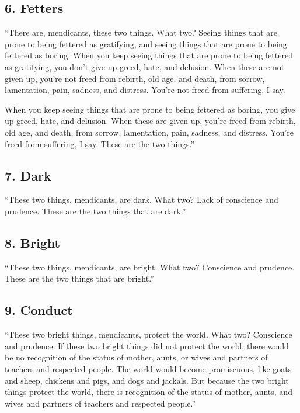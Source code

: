 \documentclass[12pt,openany]{book}%
\begin{document}
\subsection*{6. Fetters }

“There are, mendicants, these two things. What two? Seeing things that are prone to being fettered as gratifying, and seeing things that are prone to being fettered as boring. When you keep seeing things that are prone to being fettered as gratifying, you don’t give up greed, hate, and delusion. When these are not given up, you’re not freed from rebirth, old age, and death, from sorrow, lamentation, pain, sadness, and distress. You’re not freed from suffering, I say. 

When you keep seeing things that are prone to being fettered as boring, you give up greed, hate, and delusion. When these are given up, you’re freed from rebirth, old age, and death, from sorrow, lamentation, pain, sadness, and distress. You’re freed from suffering, I say. These are the two things.” 

\subsection*{7. Dark }

“These two things, mendicants, are dark. What two? Lack of conscience and prudence. These are the two things that are dark.” 

\subsection*{8. Bright }

“These two things, mendicants, are bright. What two? Conscience and prudence. These are the two things that are bright.” 

\subsection*{9. Conduct }

“These two bright things, mendicants, protect the world. What two? Conscience and prudence. If these two bright things did not protect the world, there would be no recognition of the status of mother, aunts, or wives and partners of teachers and respected people. The world would become promiscuous, like goats and sheep, chickens and pigs, and dogs and jackals. But because the two bright things protect the world, there is recognition of the status of mother, aunts, and wives and partners of teachers and respected people.” 
\end{document}
